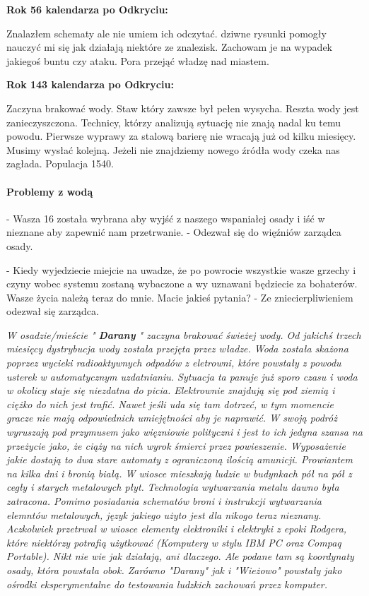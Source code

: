 \documentclass{article}
\newcommand{\paragraphx}[1]{
        \paragraph{\Large{{#1}}}\mbox{}

    }
\newcommand{\textbb}[1]{
        \smallskip
        \textbf{{#1}}
        \smallskip
    }
\begin{document}
    \textbb{Rok 56 kalendarza po Odkryciu:}

    Znalazłem schematy ale nie umiem ich odczytać. dziwne rysunki pomogły nauczyć mi się jak działają niektóre ze znalezisk. Zachowam je na wypadek jakiegoś buntu czy ataku. Pora przejąć władzę nad miastem.

    \textbb{Rok 143 kalendarza po Odkryciu:}

    Zaczyna brakować wody. Staw który zawsze był pełen wysycha. Reszta wody jest zanieczyszczona. Technicy, którzy analizują sytuację nie znają nadal ku temu powodu. Pierwsze wyprawy za stalową barierę nie wracają już od kilku miesięcy. Musimy wysłać kolejną. Jeżeli nie znajdziemy nowego źródła wody czeka nas zagłada. Populacja 1540.

    \paragraphx{Problemy z wodą}
    - Wasza 16 została wybrana aby wyjść z naszego wspaniałej osady i iść w nieznane aby zapewnić nam przetrwanie. - Odezwał się do więźniów zarządca osady.

    - Kiedy wyjedziecie miejcie na uwadze, że po powrocie wszystkie wasze grzechy i czyny wobec systemu zostaną wybaczone a wy uznawani będziecie za bohaterów. Wasze życia należą teraz do mnie. Macie jakieś pytania? - Ze zniecierpliwieniem odezwał się zarządca.\bigskip

    \slshape
    W osadzie/mieście "\textbb{Darany}" zaczyna brakować świeżej wody. Od jakichś trzech miesięcy dystrybucja wody została przejęta przez władze. Woda została skażona poprzez wycieki radioaktywnych odpadów z eletrowni, które powstały z powodu usterek w automatycznym uzdatnianiu. Sytuacja ta panuje już sporo czasu i woda w okolicy staje się niezdatna do picia. Elektrownie znajdują się pod ziemią i ciężko do nich jest trafić. Nawet jeśli uda się tam dotrzeć, w tym momencie gracze nie mają odpowiednich umiejętności aby je naprawić.
    W swoją podróż wyruszają pod przymusem jako więzniowie polityczni i jest to ich jedyna szansa na przeżycie jako, że ciąży na nich wyrok śmierci przez powieszenie. Wyposażenie jakie dostają to dwa stare automaty z ograniczoną ilością amunicji. Prowiantem na kilka dni i bronią białą. W wiosce mieszkają ludzie w budynkach pół na pół z cegły i starych metalowych płyt. Technologia wytwarzania metalu dawno była zatracona. Pomimo posiadania schematów broni i instrukcji wytwarzania elemntów metalowych, język jakiego użyto jest dla nikogo teraz nieznany. Aczkolwiek przetrwał w wiosce elementy elektroniki i elektryki z epoki Rodgera, które niektórzy potrafią użytkować (Komputery w stylu IBM PC oraz Compaq Portable). Nikt nie wie jak działają, ani dlaczego. Ale podane tam są koordynaty osady, która powstała obok. Zarówno "Darany" jak i "Wieżowo" powstały jako ośrodki eksperymentalne do testowania ludzkich zachowań przez komputer.
\end{document}
